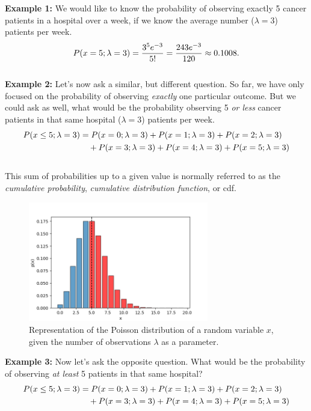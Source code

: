 \documentclass{book}
\begin{document}
\textbf{Example 1:} We would like to know the probability of observing exactly 5 cancer patients in a hospital over a week, if we know the average number ($\lambda = 3$) patients per week.
\begin{equation}
    P(x=5; \lambda = 3) = \frac{3^5 e^{-3}}{5!} = \frac{243 e^{-3}}{120} \approx 0.1008. \notag
\end{equation}\\

\textbf{Example 2:} Let's now ask a similar, but different question. So far, we have only focused on the probability of observing \textit{exactly} one particular outcome. But we could ask as well, what would be the probability observing 5 \textit{or less} cancer patients in that same hospital ($\lambda = 3$) patients per week.
\begin{align}
    P(x \leq 5; \lambda = 3) &= P(x=0; \lambda = 3) + P(x=1; \lambda = 3) + P(x=2; \lambda = 3) \notag \\
    &\quad + P(x=3; \lambda = 3) + P(x=4; \lambda = 3) + P(x=5; \lambda = 3) \notag
\end{align}\\

This sum of probabilities up to a given value is normally referred to as the \textit{cumulative probability}, \textit{cumulative distribution function}, or cdf.\\

\begin{figure}[ht]
    \centering
    \includegraphics[width=0.7\textwidth]{figures/chapter2/poisson_highlight.png}
    \caption{Representation of the Poisson distribution of a random variable $x$, given the number of observations $\lambda$ as a parameter.}
    \label{fig:poisson2}
\end{figure}

\textbf{Example 3:} Now let's ask the opposite question. What would be the probability of observing \textit{at least} 5 patients in that same hospital?
\begin{align}
    P(x \leq 5; \lambda = 3) &= P(x=0; \lambda = 3) + P(x=1; \lambda = 3) + P(x=2; \lambda = 3) \notag \\
    &\quad + P(x=3; \lambda = 3) + P(x=4; \lambda = 3) + P(x=5; \lambda = 3) \notag
\end{align}\\
\end{document}

